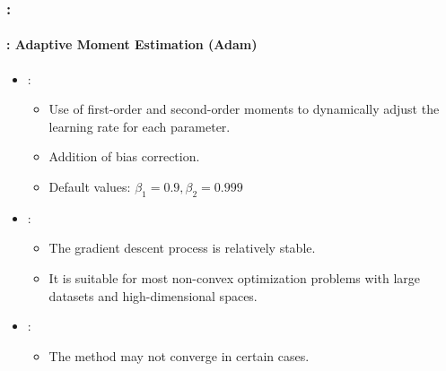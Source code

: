 \documentclass[xcolor=table]{beamer}
\begin{document}
\begin{frame}
	\frametitle{\insertshortsubtitle: \insertsection}
	\framesubtitle{\insertsubsection: Adaptive Moment Estimation (Adam)}
	
	\begin{itemize}
		\item {}:
		\begin{itemize}
			\item Use of first-order and second-order moments to dynamically adjust the learning rate for each parameter.
			\item Addition of bias correction.
			\item Default values: $\beta_1 = 0.9, \beta_2 = 0.999$ 
		\end{itemize}
		\item {}:
		\begin{itemize}
			\item The gradient descent process is relatively stable. 
			\item It is suitable for most non-convex optimization problems with large datasets and high-dimensional spaces.
		\end{itemize}
		\item {}:
		\begin{itemize}
			\item The method may not converge in certain cases.
		\end{itemize}
	\end{itemize}

\end{frame}
\end{document}
